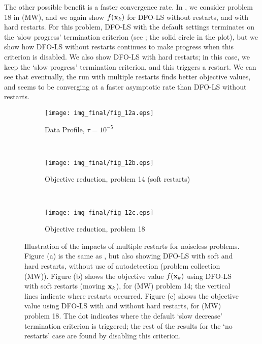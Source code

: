 The other possible benefit is a faster convergence rate.
In , we consider problem 18 in (MW), and we again show $f(\mathbf{x}_k)$ for DFO-LS without restarts, and with hard restarts.
For this problem, DFO-LS with the default settings terminates on the `slow progress' termination criterion (see ; the solid circle in the plot), but we show how DFO-LS without restarts continues to make progress when this criterion is disabled.
We also show DFO-LS with hard restarts; in this case, we keep the `slow progress' termination criterion, and this triggers a restart.
We can see that eventually, the run with multiple restarts finds better objective values, and seems to be converging at a faster asymptotic rate than DFO-LS without restarts.

\begin{figure}[t]
	\centering
	\begin{subfigure}[b]{0.48\textwidth}
		\texttt{[image: img\_final/fig\_12a.eps]}
		\caption{Data Profile, $\tau=10^{-5}$}
		\label{fig_smooth_restarts_dfols_profiles}
	\end{subfigure}
	~
	\begin{subfigure}[b]{0.48\textwidth}
		\texttt{[image: img\_final/fig\_12b.eps]}
		\caption{Objective reduction, problem 14 (soft restarts)}
		\label{fig_smooth_restarts_dfols_prob14}
	\end{subfigure}
	\\
	\begin{subfigure}[b]{0.48\textwidth}
		\texttt{[image: img\_final/fig\_12c.eps]}
		\caption{Objective reduction, problem 18}
		\label{fig_smooth_restarts_dfols_prob18}
	\end{subfigure}
	\caption{Illustration of the impacts of multiple restarts for noiseless problems. Figure (a) is the same as , but also showing DFO-LS with soft and hard restarts, without use of autodetection (problem collection (MW)). Figure (b) shows the objective value $f(\mathbf{x}_k)$ using DFO-LS with soft restarts (moving $\mathbf{x}_k$), for (MW) problem 14; the vertical lines indicate where restarts occurred. Figure (c) shows the objective value using DFO-LS with and without hard restarts, for (MW) problem 18. The dot indicates where the default `slow decrease' termination criterion is triggered; the rest of the results for the `no restarts' case are found by disabling this criterion.}
	\label{fig_smooth_restarts_dfols}
\end{figure}

